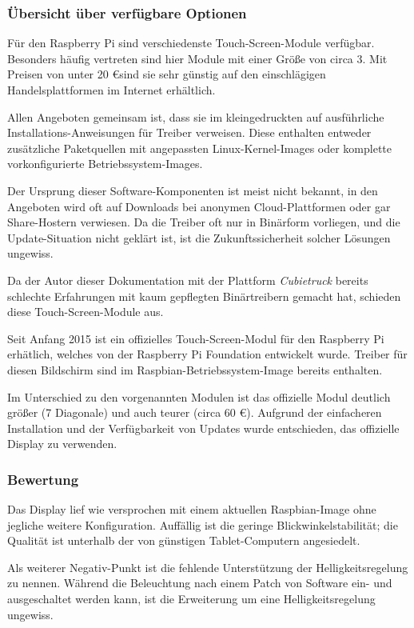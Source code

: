 \documentclass[11pt,a4paper]{IEEEtran}
\begin{document}
\subsubsection{Übersicht über verfügbare Optionen}

Für den Raspberry Pi sind verschiedenste Touch-Screen-Module verfügbar.
Besonders häufig vertreten sind hier Module mit einer Größe von circa
\SI{3}{\inch}. Mit Preisen von unter 20 \euro sind sie sehr günstig auf den
einschlägigen Handelsplattformen im Internet erhältlich.

Allen Angeboten gemeinsam ist, dass sie im kleingedruckten auf ausführliche
Installations-Anweisungen für Treiber verweisen. Diese enthalten entweder
zusätzliche Paketquellen mit angepassten Linux-Kernel-Images oder komplette
vorkonfigurierte Betriebssystem-Images. 

Der Ursprung dieser Software-Komponenten ist meist nicht bekannt, in den
Angeboten wird oft auf Downloads bei anonymen Cloud-Plattformen oder gar
Share-Hostern verwiesen. Da die Treiber oft nur in Binärform vorliegen, und die
Update-Situation nicht geklärt ist, ist die Zukunftssicherheit solcher Lösungen
ungewiss.

Da der Autor dieser Dokumentation mit der Plattform \emph{Cubietruck} bereits
schlechte Erfahrungen mit kaum gepflegten Binärtreibern gemacht hat, schieden
diese Touch-Screen-Module aus.

Seit Anfang 2015 ist ein offizielles Touch-Screen-Modul für den Raspberry Pi
erhätlich, welches von der Raspberry Pi Foundation entwickelt wurde. Treiber
für diesen Bildschirm sind im Raspbian-Betriebssystem-Image bereits enthalten.

Im Unterschied zu den vorgenannten Modulen ist das offizielle Modul deutlich
größer (\SI{7}{\inch} Diagonale) und auch teurer (circa 60 \euro). Aufgrund der
einfacheren Installation und der Verfügbarkeit von Updates wurde entschieden,
das offizielle Display zu verwenden.

\subsubsection{Bewertung}

Das Display lief wie versprochen mit einem aktuellen Raspbian-Image ohne
jegliche weitere Konfiguration. Auffällig ist die geringe
Blickwinkelstabilität; die Qualität ist unterhalb der von günstigen
Tablet-Computern angesiedelt.

Als weiterer Negativ-Punkt ist die fehlende Unterstützung der
Helligkeitsregelung zu nennen. Während die Beleuchtung nach einem Patch von
Software ein- und ausgeschaltet werden kann, ist die Erweiterung um eine
Helligkeitsregelung ungewiss\autocite{TouchBacklight}.
\end{document}
